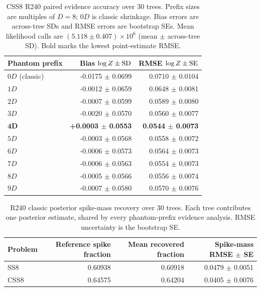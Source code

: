 \begin{table}[t]
\caption{CSS8 R240 paired evidence accuracy over 30 trees. Prefix sizes are multiples of $D=8$; $0D$ is classic shrinkage. Bias errors are across-tree SDs and RMSE errors are bootstrap SEs. Mean likelihood calls are $(5.118\pm0.407)\times10^6$ (mean $\pm$ across-tree SD). Bold marks the lowest point-estimate RMSE.}
\label{tab:phantom_evidence_css8}
\centering
\scriptsize
\begin{tabular}{lrr}
\toprule
Phantom prefix & Bias $\log Z\mathbin{\pm}{\rm SD}$ & RMSE $\log Z\mathbin{\pm}{\rm SE}$ \\
\midrule
$0D$ (classic) & -0.0175 $\pm$ 0.0699 & 0.0710 $\pm$ 0.0104 \\
$1D$ & -0.0012 $\pm$ 0.0659 & 0.0648 $\pm$ 0.0081 \\
$2D$ & -0.0007 $\pm$ 0.0599 & 0.0589 $\pm$ 0.0080 \\
$3D$ & -0.0020 $\pm$ 0.0570 & 0.0560 $\pm$ 0.0077 \\
$\boldsymbol{4D}$ & \textbf{+0.0003 $\pm$ 0.0553} & \textbf{0.0544 $\pm$ 0.0073} \\
$5D$ & -0.0003 $\pm$ 0.0568 & 0.0558 $\pm$ 0.0072 \\
$6D$ & -0.0006 $\pm$ 0.0573 & 0.0564 $\pm$ 0.0073 \\
$7D$ & -0.0006 $\pm$ 0.0563 & 0.0554 $\pm$ 0.0073 \\
$8D$ & -0.0005 $\pm$ 0.0566 & 0.0556 $\pm$ 0.0074 \\
$9D$ & -0.0007 $\pm$ 0.0580 & 0.0570 $\pm$ 0.0076 \\
\bottomrule
\end{tabular}
\end{table}

\begin{table}[t]
\caption{R240 classic posterior spike-mass recovery over 30 trees. Each tree contributes one posterior estimate, shared by every phantom-prefix evidence analysis. RMSE uncertainty is the bootstrap SE.}
\label{tab:r240_mode_mass}
\centering
\begin{tabular}{lrrr}
\toprule
Problem & Reference spike fraction & Mean recovered fraction & Spike-mass RMSE $\pm$ SE \\
\midrule
SS8 & 0.60938 & 0.60918 & 0.0479 $\pm$ 0.0051 \\
CSS8 & 0.64575 & 0.64204 & 0.0405 $\pm$ 0.0076 \\
\bottomrule
\end{tabular}
\end{table}

